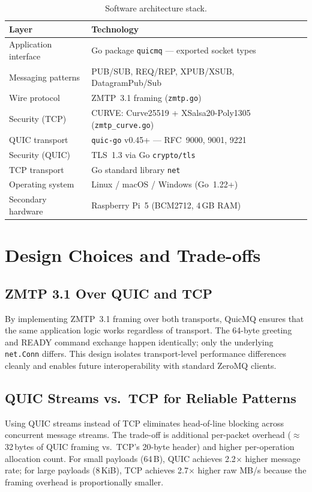\documentclass[12pt, a4paper, oneside]{report}
\begin{document}
\begin{table}[H]
  \centering
  \caption{Software architecture stack.}
  \label{tab:sw-stack}
  \begin{tabular}{ll}
    \toprule
    \textbf{Layer} & \textbf{Technology} \\
    \midrule
    Application interface & Go package \texttt{quicmq} — exported socket types \\
    Messaging patterns    & PUB/SUB, REQ/REP, XPUB/XSUB, DatagramPub/Sub \\
    Wire protocol         & ZMTP~3.1 framing (\texttt{zmtp.go}) \\
    Security (TCP)        & CURVE: Curve25519 + XSalsa20-Poly1305 (\texttt{zmtp\_curve.go}) \\
    QUIC transport        & \texttt{quic-go} v0.45+ \cite{quicgo} — RFC~9000, 9001, 9221 \\
    Security (QUIC)       & TLS~1.3 via Go \texttt{crypto/tls} \\
    TCP transport         & Go standard library \texttt{net} \\
    Operating system      & Linux / macOS / Windows (Go~1.22+) \\
    Secondary hardware    & Raspberry Pi~5 (BCM2712, 4\,GB RAM) \\
    \bottomrule
  \end{tabular}
\end{table}

\section{Design Choices and Trade-offs}
\label{sec:tradeoffs}

\subsection{ZMTP 3.1 Over QUIC and TCP}
By implementing ZMTP~3.1 framing over both transports, QuicMQ ensures that the same application logic works regardless of transport. The 64-byte greeting and READY command exchange happen identically; only the underlying \texttt{net.Conn} differs. This design isolates transport-level performance differences cleanly and enables future interoperability with standard ZeroMQ clients.

\subsection{QUIC Streams vs.\ TCP for Reliable Patterns}
Using QUIC streams instead of TCP eliminates head-of-line blocking across concurrent message streams. The trade-off is additional per-packet overhead ($\approx$32\,bytes of QUIC framing vs.\ TCP's 20-byte header) and higher per-operation allocation count. For small payloads (64\,B), QUIC achieves 2.2$\times$ higher message rate; for large payloads (8\,KiB), TCP achieves 2.7$\times$ higher raw MB/s because the framing overhead is proportionally smaller.
\end{document}
